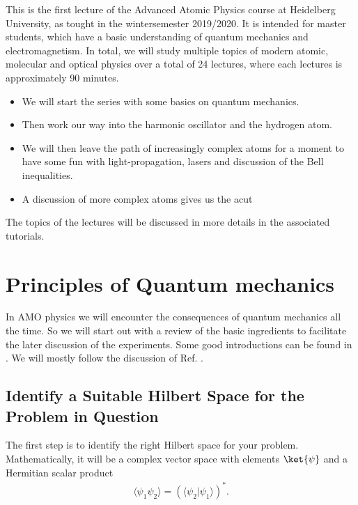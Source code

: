 This is the first lecture of the Advanced Atomic Physics course at Heidelberg University, as tought in the wintersemester 2019/2020.
It is intended for master students, which have a basic understanding of quantum mechanics and electromagnetism. In total, we will study multiple topics of modern atomic, molecular and optical physics over a total of 24 lectures, where each lectures is approximately 90 minutes. 
\begin{itemize}
\item We will start the series with some basics on quantum mechanics.
\item Then work our way into the harmonic oscillator and the hydrogen atom.
\item We will then leave the path of increasingly complex atoms for a moment to have some fun with light-propagation, lasers and discussion of the Bell inequalities.
\item A discussion of more complex atoms gives us the acut
\end{itemize}   


The topics of the lectures will be discussed in more details in the associated tutorials. 

\section{Principles of Quantum mechanics}
In AMO physics we will encounter the consequences of quantum mechanics all the time. So we will start out with a review of the basic ingredients to facilitate the later discussion of the experiments. Some good introductions can be found in \cite{2002, 2006} \cite{1}\cite{2}. We will mostly follow the discussion of Ref. \cite{2006}.

\subsection{Identify a Suitable Hilbert Space for the Problem in Question}
The first step is to identify the right Hilbert space for your problem. Mathematically, it will be a complex vector space with elements $\ket{\psi}$ and a Hermitian scalar product
\begin{align}
				\langle\psi_1 \psi_2\rangle=(\langle{\psi_2}| \psi_1\rangle)^*.
\end{align}


